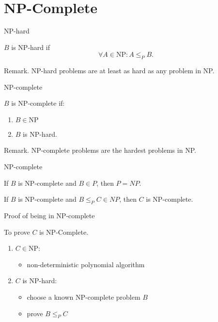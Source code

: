 \section{NP-Complete}

\begin{frame}{NP-hard}
  \begin{definition}[NP-hard]
    $B$ is NP-hard if
    \[
      \forall A \in \text{NP}: A \le_{P} B.
    \]
  \end{definition}

  \begin{alertblock}{Remark.}
    NP-hard problems are at least as hard as any problem in NP.
  \end{alertblock}
\end{frame}
\begin{frame}{NP-complete}
  \begin{definition}[NP-complete]
    $B$ is NP-complete if:
    \begin{enumerate}
      \item $B \in \text{NP}$
      \item $B$ is NP-hard.
    \end{enumerate}
  \end{definition}

  \begin{alertblock}{Remark.}
    NP-complete problems are the hardest problems in NP.
  \end{alertblock}
\end{frame}
\begin{frame}{NP-complete}
  \begin{theorem}
    If $B$ is NP-complete and $B \in P$, then $P = NP$.
  \end{theorem}

  \begin{theorem}
    If $B$ is NP-complete and $B \le_{P} C \in NP$, then $C$ is NP-complete.
  \end{theorem}
\end{frame}
\begin{frame}{Proof of being in NP-complete}
  \begin{exampleblock}{To prove $C$ is NP-Complete.}
    \begin{enumerate}
      \item $C \in \text{NP}$:
	\begin{itemize}
	  \item non-deterministic polynomial algorithm
	\end{itemize}
      \item $C$ is NP-hard:
	\begin{itemize}
	  \item choose a known NP-complete problem $B$
	  \item prove $B \le_{P} C$
	\end{itemize}
    \end{enumerate}
  \end{exampleblock}
\end{frame}

